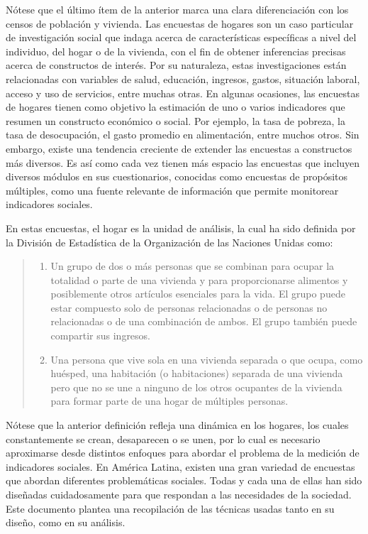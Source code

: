 \documentclass[
  12pt,
]{book}
\providecommand{\tightlist}{%
  \setlength{\itemsep}{0pt}\setlength{\parskip}{0pt}}
\begin{document}
Nótese que el último ítem de la anterior marca una clara diferenciación con los censos de población y vivienda. Las encuestas de hogares son un caso particular de investigación social que indaga acerca de características específicas a nivel del individuo, del hogar o de la vivienda, con el fin de obtener inferencias precisas acerca de constructos de interés. Por su naturaleza, estas investigaciones están relacionadas con variables de salud, educación, ingresos, gastos, situación laboral, acceso y uso de servicios, entre muchas otras. En algunas ocasiones, las encuestas de hogares tienen como objetivo la estimación de uno o varios indicadores que resumen un constructo económico o social. Por ejemplo, la tasa de pobreza, la tasa de desocupación, el gasto promedio en alimentación, entre muchos otros. Sin embargo, existe una tendencia creciente de extender las encuestas a constructos más diversos. Es así como cada vez tienen más espacio las encuestas que incluyen diversos módulos en sus cuestionarios, conocidas como encuestas de propósitos múltiples, como una fuente relevante de información que permite monitorear indicadores sociales.

En estas encuestas, el hogar es la unidad de análisis, la cual ha sido definida por la División de Estadística de la Organización de las Naciones Unidas \citep{United-Nations_2011} como:

\begin{quote}
\begin{enumerate}
\def\labelenumi{\alph{enumi}.}
\tightlist
\item
  Un grupo de dos o más personas que se combinan para ocupar la totalidad o parte de una vivienda y para proporcionarse alimentos y posiblemente otros artículos esenciales para la vida. El grupo puede estar compuesto solo de personas relacionadas o de personas no relacionadas o de una combinación de ambos. El grupo también puede compartir sus ingresos.
\item
  Una persona que vive sola en una vivienda separada o que ocupa, como huésped, una habitación (o habitaciones) separada de una vivienda pero que no se une a ninguno de los otros ocupantes de la vivienda para formar parte de una hogar de múltiples personas.
\end{enumerate}
\end{quote}

Nótese que la anterior definición refleja una dinámica en los hogares, los cuales constantemente se crean, desaparecen o se unen, por lo cual es necesario aproximarse desde distintos enfoques para abordar el problema de la medición de indicadores sociales. En América Latina, existen una gran variedad de encuestas que abordan diferentes problemáticas sociales. Todas y cada una de ellas han sido diseñadas cuidadosamente para que respondan a las necesidades de la sociedad. Este documento plantea una recopilación de las técnicas usadas tanto en su diseño, como en su análisis.
\end{document}
